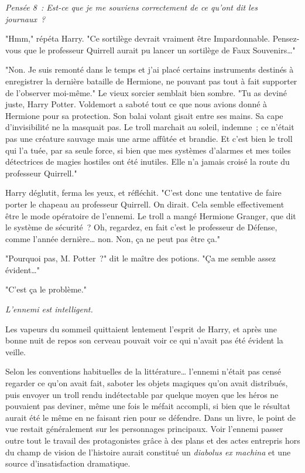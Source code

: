 \emph{Pensée 8~: Est-ce que je me souviens correctement de ce qu'ont dit les journaux~?}

"Hmm," répéta Harry. "Ce sortilège devrait vraiment être Impardonnable. Pensez-vous que le professeur Quirrell aurait pu lancer un sortilège de Faux Souvenirs…"

"Non. Je suis remonté dans le temps et j'ai placé certains instruments destinés à enregistrer la dernière bataille de Hermione, ne pouvant pas tout à fait supporter de l'observer moi-même." Le vieux sorcier semblait bien sombre. "Tu as deviné juste, Harry Potter. Voldemort a saboté tout ce que nous avions donné à Hermione pour sa protection. Son balai volant gisait entre ses mains. Sa cape d'invisibilité ne la masquait pas. Le troll marchait au soleil, indemne~; ce n'était pas une créature sauvage mais une arme affûtée et brandie. Et c'est bien le troll qui l'a tuée, par sa seule force, si bien que mes systèmes d'alarmes et mes toiles détectrices de magies hostiles ont été inutiles. Elle n'a jamais croisé la route du professeur Quirrell."

Harry déglutit, ferma les yeux, et réfléchit. "C'est donc une tentative de faire porter le chapeau au professeur Quirrell. On dirait. Cela semble effectivement être le mode opératoire de l'ennemi. Le troll a mangé Hermione Granger, que dit le système de sécurité~? Oh, regardez, en fait c'est le professeur de Défense, comme l'année dernière… non. Non, ça ne peut pas être ça."

"Pourquoi pas, M. Potter~?" dit le maître des potions. "Ça me semble assez évident…"

"C'est ça le problème."

\emph{L'ennemi est intelligent.}

Les vapeurs du sommeil quittaient lentement l'esprit de Harry, et après une bonne nuit de repos son cerveau pouvait voir ce qui n'avait pas été évident la veille.

Selon les conventions habituelles de la littérature… l'ennemi n'était pas censé regarder ce qu'on avait fait, saboter les objets magiques qu'on avait distribués, puis envoyer un troll rendu indétectable par quelque moyen que les héros ne pouvaient pas deviner, même une fois le méfait accompli, si bien que le résultat aurait été le même en ne faisant rien pour se défendre. Dans un livre, le point de vue restait généralement sur les personnages principaux. Voir l'ennemi passer outre tout le travail des protagonistes grâce à des plans et des actes entrepris hors du champ de vision de l'histoire aurait constitué un \emph{diabolus ex machina} et une source d'insatisfaction dramatique.

